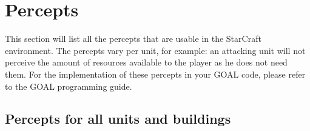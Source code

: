 \chapter{Percepts}

This section will list all the percepts that are usable in the StarCraft environment. The percepts vary per unit, for example: an attacking unit will not perceive the amount of resources available to the player as he does not need them. For the implementation of these percepts in your GOAL code, please refer to the GOAL programming guide.

\newpage
\section{Percepts for all units	and buildings}

